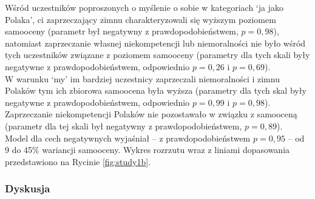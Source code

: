 \documentclass[man]{apa6}
\begin{document}
Wśród uczestników poproszonych o myślenie o sobie w kategoriach `ja jako Polaka', ci zaprzeczający zimnu charakteryzowali się wyższym poziomem samooceny (parametr był negatywny z prawdopodobieństwem, $p = 0,98$), natomiast zaprzeczanie własnej niekompetencji lub niemoralności nie było wśród tych uczestników związane z poziomem samooceny  (parametry dla tych skali były negatywne z prawdopodobieństwem, odpowiednio $p = 0,26$ i $p = 0,69$).\\

W warunku `my' im bardziej uczestnicy zaprzeczali niemoralności i zimnu Polaków tym ich zbiorowa samoocena była wyższa (parametry dla tych skal były negatywne z prawdopodobieństwem, odpowiednio $p = 0,99$ i $p = 0,98$). Zaprzeczanie niekompetencji Polaków nie pozostawało w związku z samooceną (parametr dla tej skali był negatywny z prawdopodobieństwem, $p = 0,89$).\\

Model dla cech negatywnych wyjaśniał -- z prawdopodobieństwem $p = 0,95$ -- od 9 do 45\% wariancji samooceny. Wykres rozrzutu wraz z liniami dopasowania przedstawiono na Rycinie \ref{fig:study1b}.


\begin{figure*}[htbp]
   \centering
   \caption{Autoaskrypcja negatywnych cech związanych w wymiarami kompetencji, moralności i ciepła, a poziom samooceny indywidualnej oraz kolektywnej. Punkty oznaczają latentne wyniki dla każdej osoby, z kreskami oznaczającymi błędy pomiarowe skal. Grubą linią przerywaną oznaczono najlepsze dopasowanie uzyskane w modelu regresyjnym, z cieńszymi liniami oznaczającymi błąd oszacowania.}
   \label{fig:study1b}
\end{figure*}

\subsubsection{Dyskusja}
\end{document}
